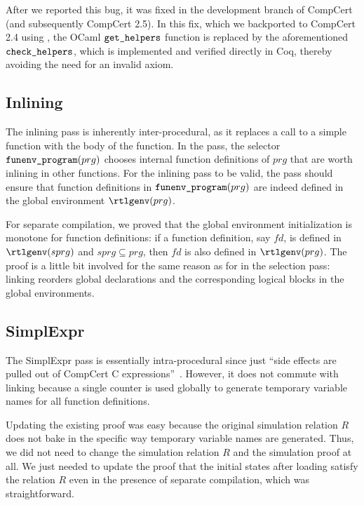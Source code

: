 After we reported this bug, it was fixed in the development branch of
CompCert (and subsequently CompCert 2.5). In this fix, which we
backported to CompCert 2.4 using , the OCaml
$\texttt{get\_helpers}$ function is replaced by the aforementioned
$\texttt{check\_helpers}$, which is implemented and verified directly
in Coq, thereby avoiding the need for an invalid axiom.

\subsection{Inlining}
The inlining pass is inherently inter-procedural, as it replaces a
call to a simple function with the body of the function.  In the pass,
the selector $\texttt{funenv\_program}(prg)$ chooses internal function
definitions of $prg$ that are worth inlining in other functions.  For
the inlining pass to be valid, the pass should ensure that function
definitions in $\texttt{funenv\_program}(prg)$ are indeed defined in
the global environment $\rtlgenv(prg)$.

For separate compilation, we proved that the global environment
initialization is monotone for function definitions: if a function
definition, say $fd$, is defined in $\rtlgenv(sprg)$ and $sprg
\subseteq prg$, then $fd$ is also defined in $\rtlgenv(prg)$.  The
proof is a little bit involved for the same reason as for
 in the selection pass: linking reorders global
declarations and the corresponding logical blocks in the global
environments.


\subsection{SimplExpr}
The SimplExpr pass is essentially intra-procedural since just ``side
effects are pulled out of CompCert C expressions''~\cite{compcert-website}.
However, it does not commute with linking because a single counter is
used globally to generate temporary variable names for all function
definitions.

Updating the existing proof was easy because the original simulation
relation $R$ does not bake in the specific way temporary variable
names are generated. Thus, we did not need to change the simulation
relation $R$ and the simulation proof at all.  We just needed to
update the proof that the initial states after loading satisfy the
relation $R$ even in the presence of separate compilation, which
was straightforward.





